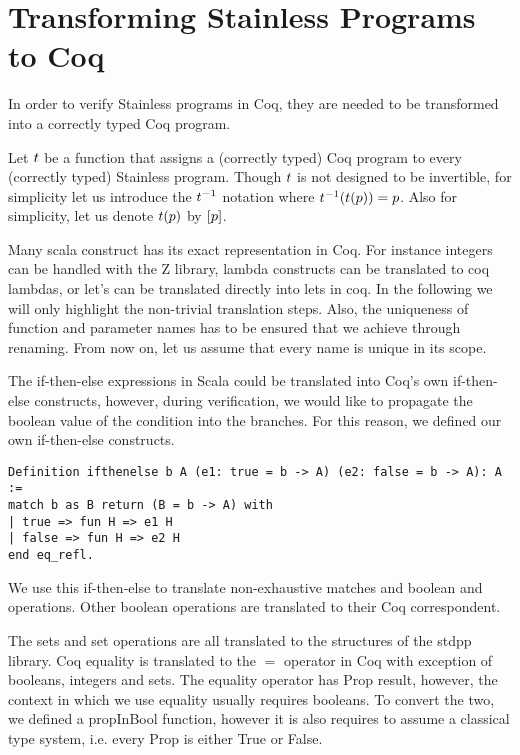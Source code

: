 \section{Transforming Stainless Programs to Coq}

In order to verify Stainless programs in Coq, they are needed to be transformed into a correctly typed Coq program.

\begin{definition}
	Let $t$ be a function that assigns a (correctly typed) Coq program to every (correctly typed) Stainless program. Though $t$ is not designed to be invertible, for simplicity let us introduce the $t^{-1}$ notation where $t^{-1}(t(p)) = p$. Also for simplicity, let us denote $t(p)$ by $[p]$.
\end{definition}

Many scala construct has its exact representation in Coq. For instance integers can be handled with the Z library, lambda constructs can be translated to coq lambdas, or let's can be translated directly into lets in coq. In the following we will only highlight the non-trivial translation steps. Also, the uniqueness of function and parameter names has to be ensured that we achieve through renaming. From now on, let us assume that every name is unique in its scope.

The if-then-else expressions in Scala could be translated into Coq's own if-then-else constructs, however, during verification, we would like to propagate the boolean value of the condition into the branches. For this reason, we defined our own if-then-else constructs.

\begin{lstlisting}[style=myCoqstyle]
Definition ifthenelse b A (e1: true = b -> A) (e2: false = b -> A): A :=
match b as B return (B = b -> A) with
| true => fun H => e1 H
| false => fun H => e2 H
end eq_refl.
\end{lstlisting}

We use this if-then-else to translate non-exhaustive matches and boolean and operations. Other boolean operations are translated to their Coq correspondent.

The sets and set operations are all translated to the structures of the stdpp library. Coq equality is translated to the $=$ operator in Coq with exception of booleans, integers and sets. The equality operator has Prop result, however, the context in which we use equality usually requires booleans. To convert the two, we defined a propInBool function, however it is also requires to assume a classical type system, i.e. every Prop is either True or False.

